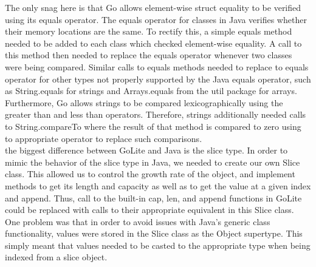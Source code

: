 \documentclass{article}
\begin{document}
The only snag here is that Go allows element-wise struct equality to be verified using its equals operator.
The equals operator for classes in Java verifies whether their memory locations are the same.
To rectify this, a simple equals method needed to be added to each class which checked element-wise equality.
A call to this method then needed to replace the equals operator whenever two classes were being compared.
Similar calls to equals methods needed to replace to equals operator for other types not properly supported by the Java equals operator, such as String.equals for strings and Arrays.equals from the util package for arrays.
Furthermore, Go allows strings to be compared lexicographically using the greater than and less than operators.
Therefore, strings additionally needed calls to String.compareTo where the result of that method is compared to zero using to appropriate operator to replace such comparisons.\\
 the biggest difference between GoLite and Java is the slice type.
In order to mimic the behavior of the slice type in Java, we needed to create our own Slice class.
This allowed us to control the growth rate of the object, and implement methods to get its length and capacity as well as to get the value at a given index and append.
Thus, call to the built-in cap, len, and append functions in GoLite could be replaced with calls to their appropriate equivalent in this Slice class.
One problem was that in order to avoid issues with Java's generic class functionality, values were stored in the Slice class as the Object supertype.
This simply meant that values needed to be casted to the appropriate type when being indexed from a slice object.
\end{document}
